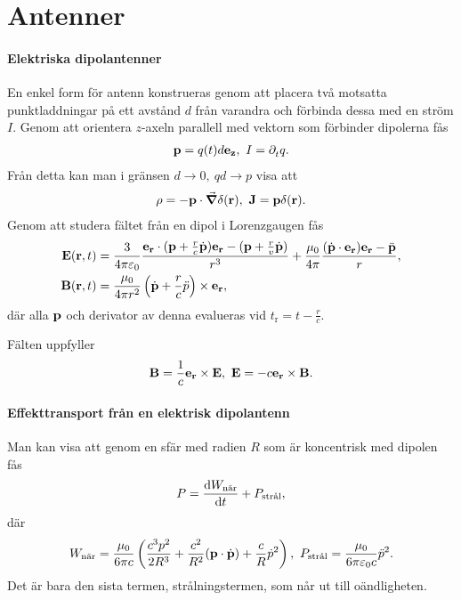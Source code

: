 \section{Antenner}

\paragraph{Elektriska dipolantenner}
En enkel form för antenn konstrueras genom att placera två motsatta punktladdningar på ett avstånd $d$ från varandra och förbinda dessa med en ström $I$. Genom att orientera $z$-axeln parallell med vektorn som förbinder dipolerna fås
\begin{align*}
	\vb{p} = q(t)d\vb{e}_{\vb{z}},\ I = \partial_{t}^{}q.
\end{align*}
Från detta kan man i gränsen $d\to 0,\ qd\to p$ visa att
\begin{align*}
	\rho = -\vb{p}\cdot\grad{\delta(\vb{r})},\ \vb{J} = \vb{p}\delta(\vb{r}).
\end{align*}
Genom att studera fältet från en dipol i Lorenzgaugen fås
\begin{align*}
	\vb{E}(\vb{r}, t) &= \frac{3}{4\pi\varepsilon_{0}}\frac{\vb{e}_{\vb{r}}\cdot(\vb{p} + \frac{r}{c}\dot{\vb{p}})\vb{e}_{\vb{r}} - (\vb{p} + \frac{r}{v}\dot{\vb{p}})}{r^{3}} + \frac{\mu_{0}}{4\pi}\frac{(\dot{\vb{p}}\cdot\vb{e}_{\vb{r}})\vb{e}_{\vb{r}} - \ddot{\vb{p}}}{r}, \\
	\vb{B}(\vb{r}, t) &= \frac{\mu_{0}}{4\pi r^{2}}\left(\dot{\vb{p}} + \frac{r}{c}\ddot{p}\right)\times\vb{e}_{\vb{r}},
\end{align*}
där alla $\vb{p}$ och derivator av denna evalueras vid $t_{\text{r}} = t - \frac{r}{c}$.

Fälten uppfyller
\begin{align*}
	\vb{B} = \frac{1}{c}\vb{e}_{\vb{r}}\times\vb{E},\ \vb{E} = -c\vb{e}_{\vb{r}}\times\vb{B}.
\end{align*}

\paragraph{Effekttransport från en elektrisk dipolantenn}
Man kan visa att genom en sfär med radien $R$ som är koncentrisk med dipolen fås
\begin{align*}
	P = \dv{W_{\text{när}}}{t} + P_{\text{strål}},
\end{align*}
där
\begin{align*}
	W_{\text{när}} = \frac{\mu_{0}}{6\pi c}\left(\frac{c^{3}p^{2}}{2R^{3}} + \frac{c^{2}}{R^{2}}(\vb{p}\cdot\dot{\vb{p}}) + \frac{c}{R}\dot{p}^{2}\right),\ P_{\text{strål}} = \frac{\mu_{0}}{6\pi\varepsilon_{0}c}\ddot{p}^{2}.
\end{align*}
Det är bara den sista termen, strålningstermen, som når ut till oändligheten.

